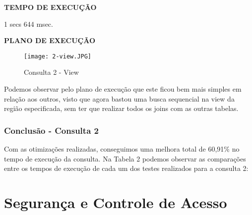 \documentclass[12pt,a4paper]{article}
\begin{document}
\begin{flushleft}
\textbf{TEMPO DE EXECUÇÃO}\\
\end{flushleft}
1 secs 644 msec.\\

\begin{flushleft}
\textbf{PLANO DE EXECUÇÃO}\\
\end{flushleft}

\begin{figure}[H]
    \centering
    \texttt{[image: 2-view.JPG]}
    \caption{Consulta 2 - View}
    \label{fig:diagrama}
\end{figure}

Podemos observar pelo plano de execução que este ficou bem mais simples em relação aos outros, visto que agora bastou uma busca sequencial na view da região especificada, sem ter que realizar todos os joins com as outras tabelas.

\subsubsection{Conclusão - Consulta 2}

Com as otimizações realizadas, conseguimos uma melhora total de 60,91\% no tempo de execução da consulta. Na Tabela 2 podemos observar as comparações entre os tempos de execução de cada um dos testes realizados para a consulta 2:

\begin{table}[htbp]
  \centering
  \caption{Comparação - Consulta 2}
  \label{tab:addlabel}%
\end{table}%


\section{Segurança e Controle de Acesso}
\end{document}
